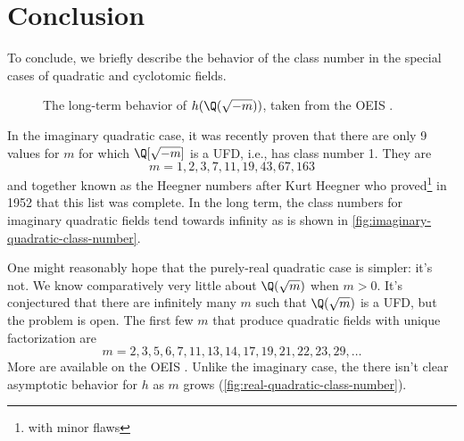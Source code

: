 \section{Conclusion}

To conclude, we briefly describe the behavior of the class number in the special cases of quadratic and cyclotomic fields.

\begin{figure}
    \centering
    \caption{The long-term behavior of $h(\Q(\sqrt{-m}))$, taken from the OEIS \cite[A000924]{oeis}.}
    \label{fig:imaginary-quadratic-class-number}
\end{figure}

In the imaginary quadratic case, it was recently proven that there are only 9 values for $m$ for which $\Q[\sqrt{-m}]$ is a UFD, i.e., has class number 1.
They are
\begin{equation}
    m = 1, 2, 3, 7, 11, 19, 43, 67, 163
\end{equation}
and together known as the Heegner numbers \cite[A000924]{oeis} after Kurt Heegner who proved\footnote{with minor flaws} in 1952 that this list was complete. In the long term, the class numbers for imaginary quadratic fields tend towards infinity as is shown in \autoref{fig:imaginary-quadratic-class-number}.

One might reasonably hope that the purely-real quadratic case is simpler: it's not. We know comparatively very little about $\Q(\sqrt m)$ when $m > 0$. It's conjectured that there are infinitely many $m$ such that $\Q(\sqrt m)$ is a UFD, but the problem is open.
The first few $m$ that produce quadratic fields with unique factorization are
\begin{equation}
    m = 2, 3, 5, 6, 7, 11, 13, 14, 17, 19, 21, 22, 23, 29, \ldots
\end{equation}
More are available on the OEIS \cite[A003172]{oeis}. Unlike the imaginary case, the there isn't clear asymptotic behavior for $h$ as $m$ grows (\autoref{fig:real-quadratic-class-number}).

